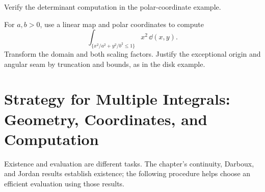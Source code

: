 \begin{exercise}
Verify the determinant computation in the polar-coordinate example.
\end{exercise}

\begin{exercise}
For $a,b>0$, use a linear map and polar coordinates to compute
\[
\int_{\{x^2/a^2+y^2/b^2\leq1\}}
x^2\,\dd(x,y).
\]
Transform the domain and both scaling factors. Justify the exceptional
origin and angular seam by truncation and bounds, as in the disk example.
\end{exercise}


\section{Strategy for Multiple Integrals: Geometry, Coordinates, and Computation}
Existence and evaluation are different tasks. The chapter's continuity,
Darboux, and Jordan results establish existence; the following procedure
helps choose an efficient evaluation using those results.

